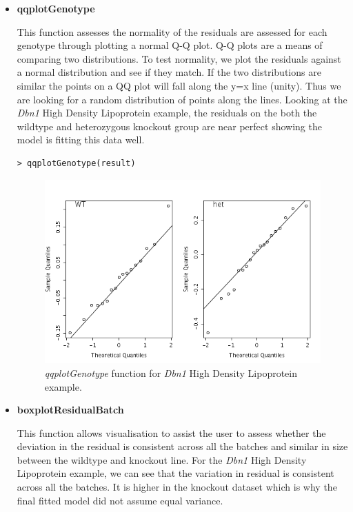 \documentclass[12pt,a4paper]{article}
\begin{document}
\begin{itemize}
\item \textbf{qqplotGenotype} 

This function assesses the normality of the residuals are assessed for each genotype through plotting a normal Q-Q plot. Q-Q plots are a means of comparing two distributions. To test normality, we plot the residuals against a normal distribution and see if they match. If the two distributions are similar the points on a QQ plot will fall along the y=x line (unity). Thus we are looking for a random distribution of points along the lines. Looking at the \textit{Dbn1} High Density Lipoprotein example, the residuals on the both the wildtype and heterozygous knockout group are near perfect showing the model is fitting this data well. 

\begingroup
\fontsize{8pt}{12pt}\selectfont
\begin{verbatim}
> qqplotGenotype(result)
\end{verbatim}
\endgroup 

\begin{figure}[H]%
\centerline{\includegraphics[scale=0.5]{cs_tf_5.png}}
\caption{\textit{qqplotGenotype} function for \textit{Dbn1} High Density Lipoprotein example.}\label{fig:cs_tf5}
\end{figure}

\item \textbf{boxplotResidualBatch} 

This function allows visualisation to assist the user to assess whether the deviation in the residual is consistent across all the batches and similar in size between the wildtype and knockout line. For the \textit{Dbn1} High Density Lipoprotein example, we can see that the variation in residual is consistent across all the batches.  It is higher in the knockout dataset which is why the final fitted model did not assume equal variance.  


\end{itemize}
\end{document}
